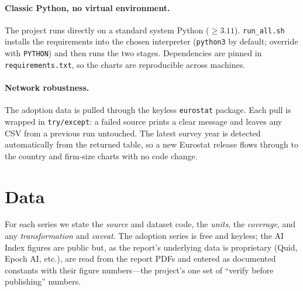 \documentclass[11pt,a4paper]{article}
\newcommand{\code}[1]{\texttt{#1}}
\begin{document}
\paragraph{Classic Python, no virtual environment.} The project runs directly on
a standard system Python ($\ge 3.11$). \code{run\_all.sh} installs the
requirements into the chosen interpreter (\code{python3} by default; override
with \code{PYTHON}) and then runs the two stages. Dependencies are pinned in
\code{requirements.txt}, so the charts are reproducible across machines.

\paragraph{Network robustness.} The adoption data is pulled through the keyless
\code{eurostat} package. Each pull is wrapped in \code{try/except}: a failed
source prints a clear message and leaves any CSV from a previous run untouched.
The latest survey year is detected automatically from the returned table, so a
new Eurostat release flows through to the country and firm-size charts with no
code change.

\section{Data}\label{sec:data}

For each series we state the \emph{source} and dataset code, the \emph{units},
the \emph{coverage}, and any \emph{transformation} and \emph{caveat}. The
adoption series is free and keyless; the AI Index figures are public but, as the
report's underlying data is proprietary (Quid, Epoch AI, etc.), are read from the
report PDFs and entered as documented constants with their figure numbers---the
project's one set of ``verify before publishing'' numbers.

\end{document}
